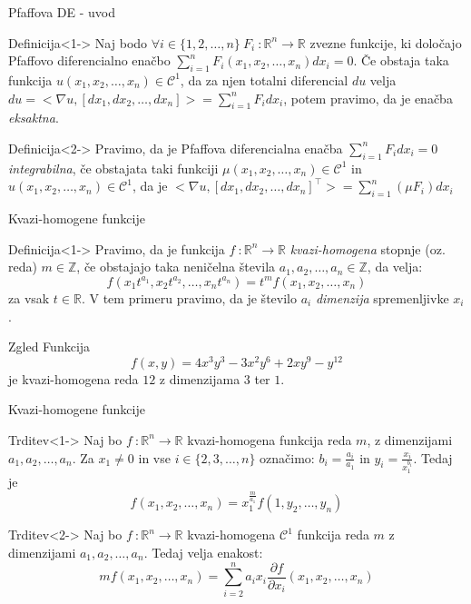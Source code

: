 \documentclass[t, 10pt]{beamer} %
\newcommand{\mth}[1]{\ensuremath{\mathbb{#1}}}
\newcommand{\R}{\mth{R}}
\newcommand{\Z}{\mth{Z}}
\newcommand{\pojem}[1]{\emph{#1}}
\newcommand{\map}[3]{\ensuremath{{#1}~: {#2} \rightarrow {#3}}}
\newcommand{\fillblack}[1]{
	\begin{tikzpicture}[remember picture, overlay]
		\node [shift={(0 cm,0cm)}]  at (current page.south west)
		{%
			\begin{tikzpicture}[remember picture, overlay] at (current page.south west)
				\draw [fill=black] (0, 0) -- (0,#1 \paperheight) --
				(\paperwidth,#1 \paperheight) -- (\paperwidth,0) -- cycle ;
			\end{tikzpicture}
		};
		\draw (current page.north west) rectangle (current page.south east);
	\end{tikzpicture}
}
\begin{document}
	\begin{frame}{Pfaffova DE - uvod}
		
		\begin{block}{Definicija}<1->
			Naj bodo $\forall i\in\{1, 2, \ldots, n\}~ \map{F_i}{\R^n}{\R}$ zvezne funkcije, ki določajo Pfaffovo diferencialno enačbo $\sum_{i = 1}^{n}F_i(x_1, x_2, \ldots, x_n)dx_i = 0$. Če obstaja taka funkcija $u(x_1, x_2, \ldots, x_n)\in \mathcal{C}^1$, da za njen totalni diferencial $du$ velja $du = <\nabla u, [dx_1, dx_2, \ldots, dx_n]> = \sum_{i = 1}^{n}F_i dx_i$, potem pravimo, da je enačba \pojem{eksaktna}.
		\end{block}
		\begin{block}{Definicija}<2->
			Pravimo, da je Pfaffova diferencialna enačba $\sum_{i = 1}^n F_i dx_i = 0$ \pojem{integrabilna}, če obstajata taki funkciji $\mu(x_1, x_2, \ldots, x_n)\in \mathcal{C}^1$ in $u(x_1, x_2, \ldots, x_n)\in \mathcal{C}^1$, da je $<\nabla u,[dx_1, dx_2, \ldots, dx_n]^\top> = \sum_{i = 1}^n (\mu F_i) dx_i$
		\end{block}
		
	\end{frame}
	
	\begin{frame}{Kvazi-homogene funkcije}
		\begin{block}{Definicija}<1->
			Pravimo, da je funkcija $\map{f}{\R^n}{\R}$ \pojem{kvazi-homogena} stopnje (oz. reda) $m\in\Z$, če obstajajo taka neničelna števila $a_1, a_2, \ldots, a_n \in \Z$, da velja: $$f(x_1t^{a_1}, x_2t^{a_2}, \ldots, x_nt^{a_n}) = t^mf(x_1, x_2, \ldots, x_n)$$
			za vsak $t\in\R$.
			V tem primeru pravimo, da je število $a_i$ \pojem{dimenzija} spremenljivke $x_i$.
		\end{block}
		\begin{block}{Zgled}
			Funkcija $$f(x, y) = 4x^3y^3 -3x^2y^6 + 2xy^9 - y^{12}$$ je kvazi-homogena reda $12$ z dimenzijama $3$ ter $1$.
		\end{block}
	\end{frame}
	
	\begin{frame}{Kvazi-homogene funkcije}
		
		\begin{block}{Trditev}<1->
			Naj bo $\map{f}{\R^n}{\R}$ kvazi-homogena funkcija reda $m$, z dimenzijami $a_1, a_2, \ldots, a_n$. Za $x_1 \neq 0$ in vse $i\in \{2, 3, \ldots, n\}$ označimo: $b_i = \frac{a_i}{a_1}$ in $y_i = \frac{x_i}{x_1^{b_i}}$. Tedaj je $$f(x_1, x_2, \ldots, x_n) = x_1^{\frac{m}{a_1}}f(1, y_2, \ldots, y_n)$$
		\end{block}
		
		\begin{block}{Trditev}<2->
			Naj bo $\map{f}{\R^n}{\R}$ kvazi-homogena $\mathcal{C}^1$ funkcija reda $m$ z dimenzijami $a_1, a_2, \ldots, a_n$. Tedaj velja enakost: $$mf(x_1, x_2, \ldots, x_n) = \sum_{i = 2}^{n}a_ix_i\frac{\partial f}{\partial x_i}(x_1, x_2, \ldots, x_n)$$
		\end{block}
		\end{frame}
		
\end{document}
